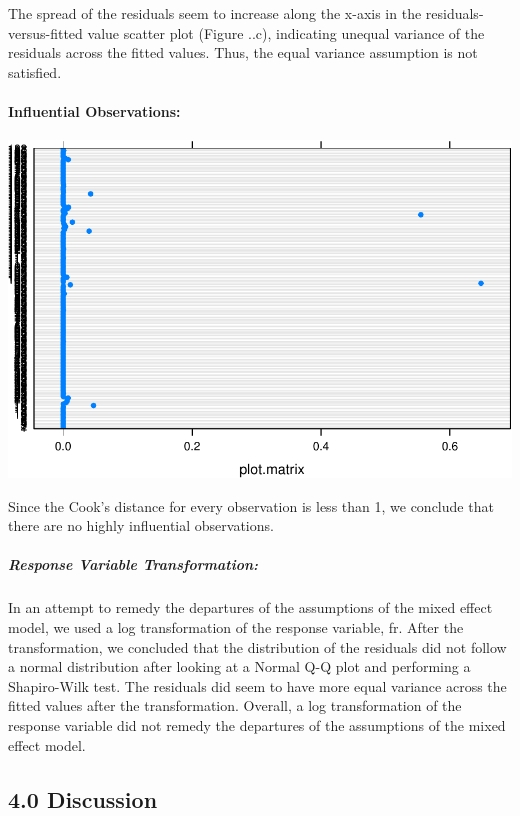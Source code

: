 \documentclass[]{article}
\let\oldparagraph\paragraph
\renewcommand{\paragraph}[1]{\oldparagraph{#1}\mbox{}}
\let\oldsubparagraph\subparagraph
\renewcommand{\subparagraph}[1]{\oldsubparagraph{#1}\mbox{}}
\begin{document}
The spread of the residuals seem to increase along the x-axis in the
residuals-versus-fitted value scatter plot (Figure ..c), indicating
unequal variance of the residuals across the fitted values. Thus, the
equal variance assumption is not satisfied.

\hypertarget{influential-observations}{%
\paragraph{Influential Observations:}\label{influential-observations}}

\includegraphics{Project3_Rongkui_files/figure-latex/unnamed-chunk-23-1.pdf}

Since the Cook's distance for every observation is less than 1, we
conclude that there are no highly influential observations.

\hypertarget{response-variable-transformation}{%
\subparagraph{Response Variable
Transformation:}\label{response-variable-transformation}}

In an attempt to remedy the departures of the assumptions of the mixed
effect model, we used a log transformation of the response variable, fr.
After the transformation, we concluded that the distribution of the
residuals did not follow a normal distribution after looking at a Normal
Q-Q plot and performing a Shapiro-Wilk test. The residuals did seem to
have more equal variance across the fitted values after the
transformation. Overall, a log transformation of the response variable
did not remedy the departures of the assumptions of the mixed effect
model.

\hypertarget{discussion}{%
\subsection{4.0 Discussion}\label{discussion}}
\end{document}
